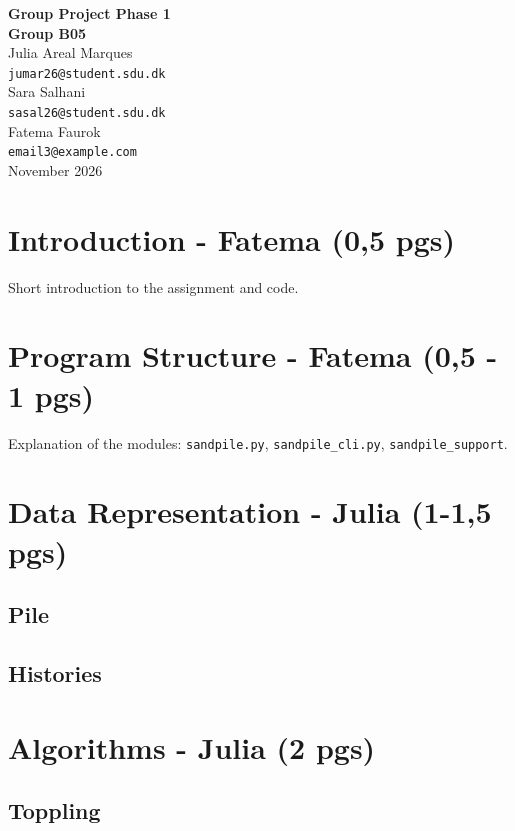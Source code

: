 \documentclass{article}
\begin{document}
\begin{titlepage}
    \centering
    \vspace*{4cm}
    \Huge \textbf{Group Project Phase 1} \\[1cm]
    \Large \textbf{Group B05} \\[1cm]
    \large
    Julia Areal Marques \\ \texttt{jumar26@student.sdu.dk} \\[0.5cm]
    Sara Salhani \\ \texttt{sasal26@student.sdu.dk} \\[0.5cm]
    Fatema Faurok \\ \texttt{email3@example.com} \\[1cm]
    \Large November 2026
\end{titlepage}

\tableofcontents
\newpage

\section{Introduction - Fatema (0,5 pgs)}
Short introduction to the assignment and code.

\section{Program Structure - Fatema (0,5 - 1 pgs)}
Explanation of the modules: \texttt{sandpile.py}, \texttt{sandpile\_cli.py}, \texttt{sandpile\_support}.

\section{Data Representation - Julia (1-1,5 pgs)}

\subsection{Pile}

\subsection{Histories}

\section{Algorithms - Julia (2 pgs)}

\subsection{Toppling}
\end{document}
